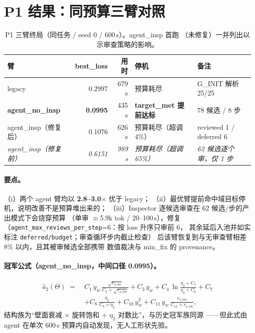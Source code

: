 \documentclass[11pt,a4paper]{ctexart}
\newcommand{\rol}{r_{o,loc}}
\newcommand{\yw}{y_w}
\newcommand{\et}{\eta_2}
\begin{document}
\section{P1 结果：同预算三臂对照}

\begin{table}[htbp]\centering\small
\caption{P1 三臂终局（同任务 / seed 0 / 600\,s）。agent\_insp 首跑
（未修复）一并列出以示审查策略的影响。}
\begin{tabular}{@{}lrrll@{}}
\toprule
臂 & best\_loss & 用时 & 停机 & 备注 \\
\midrule
legacy & 0.2997 & 679 s & 预算耗尽 & G\_INIT 解析 25/25 \\
\textbf{agent\_no\_insp} & \textbf{0.0995} & 435 s & \textbf{target\_met 提前达标} & 78 候选 / 8 步 \\
agent\_insp（修复后） & 0.1076 & 626 s & 预算耗尽（超调 4\%） & reviewed 1 / deferred 6 \\
\midrule
\textit{agent\_insp（修复前）} & \textit{0.6151} & \textit{989 s} & \textit{预算耗尽（超调 65\%）} & \textit{62 候选逐个审，仅 1 步} \\
\bottomrule
\end{tabular}
\end{table}

\paragraph{要点。}
（i）两个 agent 臂均以 \textbf{2.8--3.0$\times$} 优于 legacy；
（ii）最优臂提前命中域目标停机，说明改善不是预算堆出来的；
（iii）Inspector 逐候选审查在 62 候选/步的产出模式下会烧穿预算
（单审 $\approx$5.9k tok / 20--100\,s），修复
（\texttt{agent\_max\_reviews\_per\_step}=6：按 loss 升序只审前 6，
其余延后入池并如实标注 \texttt{deferred/budget}；审查循环步内截止检查）
后该臂恢复到与无审查臂相差 8\% 以内，且其被审候选全部携带
数值裁决与 min\_fix 的 provenance。

\paragraph{冠军公式（agent\_no\_insp，中间口径 0.0995）。}
\begin{equation}
\begin{aligned}
\hat a_2(\Theta) \;=\;& C_1\,\yw\,\frac{\sqrt{\rol}}{C_2+\sqrt{\rol}}
  + C_3\,\yw + C_4\,\ln\frac{\et+C_5}{\et+C_6} + C_7 \\
  &+ C_8\,\frac{\et}{C_9+\et} + C_{10}\,\yw^2
   + C_{11}\,\yw\,\frac{\rol}{C_{12}+\rol},
\end{aligned}
\end{equation}
结构族为``壁面衰减 $\times$ 旋转饱和 + $\et$ 对数比''，与历史冠军族同源
——但此式由 agent 在单次 600\,s 预算内自动发现，无人工形状先验。
\end{document}
